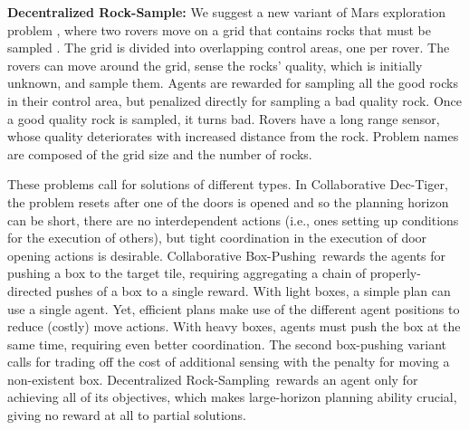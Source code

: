 \documentclass[runningheads]{llncs}
\newcommand{\ronen}[1]{\textbf{[\color{blue}RONEN:#1]}}
\newcommand{\cbp}[0]{Collaborative Box-Pushing}
\newcommand{\cdt}[0]{Collaborative Dec-Tiger}
\newcommand{\drs}[0]{Decentralized Rock-Sampling}
\begin{document}

{\bf Decentralized Rock-Sample:}
We suggest a new variant of Mars exploration problem \cite{smith2005point}, where two rovers move on a grid
that contains rocks that must be sampled . The grid is divided into overlapping control areas, one per rover. The rovers can move around the grid, sense the rocks' quality, which is initially unknown, and sample them. Agents are rewarded for sampling all the good rocks in their control area, but penalized directly for sampling a bad quality rock. Once a good quality rock is sampled, it turns bad. Rovers have a long range sensor, whose quality deteriorates with increased distance from the rock. 
Problem names are composed of the grid size and the number of rocks.

These problems call for solutions of different types.
In \cdt, the problem resets after one of the doors is opened and so the planning horizon can be short, there are no interdependent actions (i.e., ones setting up conditions for the execution of others), but tight coordination in the execution of door opening actions is desirable.
\cbp\ rewards the agents for pushing a box to the target tile, requiring aggregating a chain of properly-directed pushes of a box to a single reward. With light boxes, a simple plan can use a single agent. Yet, efficient plans make use of the different agent positions to reduce (costly) move actions. With heavy boxes, agents must push the box at the same time, requiring even better coordination. The second box-pushing variant calls for trading off the cost of additional sensing with the penalty for moving a non-existent box.
\drs\ rewards an agent only for achieving all of its objectives, which makes large-horizon planning ability crucial, giving no reward at all to partial solutions.
\end{document}
